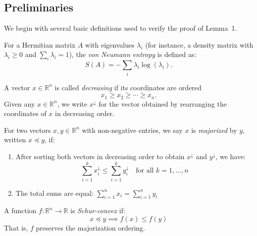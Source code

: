 \bigskip

\subsection*{Preliminaries}

\noindent We begin with several basic definitions used to verify the proof of Lemma~1.

\begin{definition}
\label{def:vonNeumannEntropy}
\leanok
For a Hermitian matrix $A$ with eigenvalues $\lambda_i$ (for instance, a density matrix with $\lambda_i \geq 0$ and $\sum_i \lambda_i = 1$), 
the \emph{von Neumann entropy} is defined as:
$$S(A) = -\sum_i \lambda_i \log(\lambda_i).$$
\end{definition}

\begin{definition}
\label{def:decreasing_vector}
A vector $x \in \mathbb{R}^n$ is called \emph{decreasing} if its coordinates are ordered
$$x_1 \geq x_2 \geq \cdots \geq x_n.$$
Given any $x \in \mathbb{R}^n$, we write $x^{\downarrow}$ for the vector obtained by rearranging the coordinates of $x$ in decreasing order.
\end{definition}

\begin{definition}
\label{def:majorization}
For two vectors $x, y \in \mathbb{R}^n$ with non-negative entries, we say $x$ is \emph{majorized} by $y$, written $x \preceq y$, if:
\begin{enumerate}
\item After sorting both vectors in decreasing order to obtain $x^{\downarrow}$ and $y^{\downarrow}$, we have:
$$\sum_{i=1}^k x^{\downarrow}_i \leq \sum_{i=1}^k y^{\downarrow}_i \quad \text{for all } k = 1, \ldots, n$$
\item The total sums are equal: $\sum_{i=1}^n x_i = \sum_{i=1}^n y_i$
\end{enumerate}
\end{definition}

\begin{definition}
\label{def:SchurConvex}
\leanok
A function $f: \mathbb{R}^n \to \mathbb{R}$ is \emph{Schur-convex} if:
$$x \preceq y \implies f(x) \leq f(y)$$
That is, $f$ preserves the majorization ordering.
\end{definition}

\bigskip

